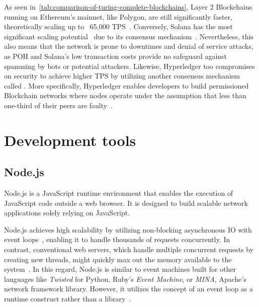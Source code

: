 As seen in~\cref{tab:comparison-of-turing-complete-blockchains}, Layer 2 \glspl{Blockchain} running on Ethereum's mainnet, like Polygon, are still significantly faster, theoretically scaling up to ~65,000 \gls{TPS}~\autocite{bybit_learn_11_2022}.
Conversely, Solana has the most significant scaling potential~\autocite{bybit_learn_11_2022} due to its  consensus mechanism~\autocite{yakovenko_proof_2020}.
Nevertheless, this also means that the network is prone to downtimes and denial of service attacks, as \gls{POH} and Solana's low transaction costs provide no safeguard against spamming by bots or potential attackers.
Likewise, Hyperledger too compromises on security to achieve higher \gls{TPS} by utilizing another consensus mechanism called .
More specifically, Hyperledger enables developers to build permissioned \gls{Blockchain} networks where nodes operate under the assumption that less than one-third of their peers are faulty~\autocites{ferris_does_2019}[1]{sukhwani_performance_2017}.

\section{Development tools}\label{sec:development-tools}

\subsection{Node.js}\label{subsec:node.js}

Node.js is a JavaScript runtime environment that enables the execution of JavaScript code outside a web browser.
It is designed to build scalable network applications solely relying on JavaScript.

Node.js achieves high scalability by utilizing non-blocking asynchronous \gls{IO} with event loops~\autocites{openjs_foundation_about_nodate}[74]{shah_nodejs_2017}, enabling it to handle thousands of requests concurrently.
In contrast, conventional web servers, which handle multiple concurrent requests by creating new threads, might quickly max out the memory available to the system~\autocite[7-8]{chhetri_comparative_2016}.
In this regard, Node.js is similar to event machines built for other languages like \emph{Twisted} for Python, Ruby's \emph{Event Machine}, or \emph{MINA}, Apache's network framework library.
However, it utilizes the concept of an event loop as a runtime construct rather than a library~\autocite{openjs_foundation_about_nodate}.

